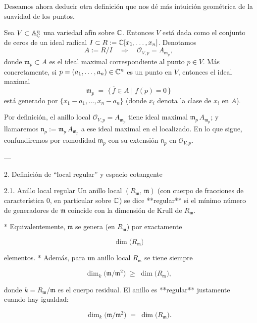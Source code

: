 Deseamos ahora deducir otra definición que nos dé más intuición geométrica de la suavidad de los puntos. 


Sea $V \subset \mathbb{A}^n_{\mathbb{C}}$ una variedad afín sobre $\mathbb{C}$.  Entonces $V$ está dada como el conjunto de ceros de un ideal radical $I \subset R := \mathbb{C}[x_1,\dots,x_n]$.  Denotamos
\begin{equation*}
	A := R / I 
	\quad\Longrightarrow\quad
	\mathcal{O}_{V,p} = A_{\mathfrak m_p},
\end{equation*}
donde $\mathfrak m_p \subset A$ es el ideal maximal correspondiente al punto $p\in V$.  Más concretamente, si $p=(a_1,\dots,a_n)\in \mathbb{C}^n$ es un punto en $V$, entonces el ideal maximal
\begin{equation*}
	\mathfrak m_p \;=\; \{\,\overline{f} \in A \mid f(p)=0\,\}
\end{equation*}
está generado por $\{\overline{x_1}-a_1,\dots,\overline{x_n}-a_n\}$ (donde $\overline{x_i}$ denota la clase de $x_i$ en $A$).

Por definición, el anillo local $\mathcal{O}_{V,p} = A_{\mathfrak m_p}$ tiene ideal maximal $\mathfrak m_p\,A_{\mathfrak m_p}$; y llamaremos $\mathfrak n_p:=\mathfrak m_p\,A_{\mathfrak m_p}$ a ese ideal maximal en el localizado.  En lo que sigue, confundiremos por comodidad $\mathfrak m_p$ con su extensión $\mathfrak n_p$ en $\mathcal O_{V,p}$.

---

 2. Definición de “local regular” y espacio cotangente

 2.1. Anillo local regular
Un anillo local $(R_{\mathfrak m},\,\mathfrak m)$ (con cuerpo de fracciones de característica 0, en particular sobre $\mathbb{C}$) se dice **regular** si el mínimo número de generadores de $\mathfrak m$ coincide con la dimensión de Krull de $R_{\mathfrak m}$.

* Equivalentemente, $\mathfrak m$ se genera (en $R_{\mathfrak m}$) por exactamente

  $$
    \dim \bigl(R_{\mathfrak m}\bigr)
  $$

  elementos.
* Además, para un anillo local $R_{\mathfrak m}$ se tiene siempre

  $$
    \dim_{k} \bigl(\mathfrak m / \mathfrak m^2\bigr) \;\ge\; \dim\bigl(R_{\mathfrak m}\bigr),
  $$

  donde $k=R_{\mathfrak m}/\mathfrak m$ es el cuerpo residual.  El anillo es **regular** justamente cuando hay igualdad:

  $$
    \dim_{k} \bigl(\mathfrak m/\mathfrak m^2\bigr)
    \;=\; \dim\bigl(R_{\mathfrak m}\bigr).
  $$

